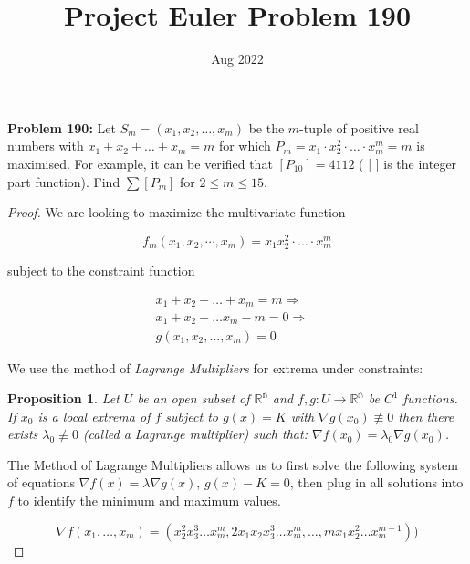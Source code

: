 \documentclass[12pt]{article}
\newtheorem{proposition}{Proposition}[section]
\begin{document}
\title{Project Euler Problem 190}
\date{Aug 2022}
\author{}
\maketitle

\textbf{Problem 190:} Let $S_m = \left(x_1, x_2,\ldots, x_m \right)$ be the $m$-tuple of positive real numbers with $x_1 + x_2 + \ldots + x_m = m$ for which $P_m = x_1 \cdot x_2^2 \cdot \ldots \cdot x_m^m = m$ is maximised. For example, it can be verified that $\left[ P_{10} \right] = 4112$ ( [ ] is the integer part function). Find $\sum \left[ P_m \right]$ for $2 \leq m \leq 15$.

\begin{proof}
We are looking to maximize the multivariate function

\begin{equation*}
f_m (x_1,x_2,\cdots,x_m) = x_1 x_2^2\cdot \ldots \cdot x_m^m
\end{equation*}

subject to the constraint function 

\begin{align*}
x_1 + x_2 + \ldots +x_m = m \Rightarrow &\\
x_1 + x_2 + \ldots x_m - m = 0 \Rightarrow &\\
g(x_1,x_2,\ldots,x_m) = 0
\end{align*}

We use the method of \textit{Lagrange Multipliers} for extrema under constraints:

\begin{proposition}
Let $U$ be an open subset of $\mathbb{R^n}$ and $f,g: U \rightarrow \mathbb{R^n}$ be $C^{1}$ functions.
If $x_0$ is a local extrema of $f$ subject to $g(x) = K$ with $\nabla g(x_0) \not\equiv 0$ then there exists $\lambda_0 \not\equiv 0$ (called a Lagrange multiplier) such that: $\nabla f(x_0) = \lambda_0 \nabla g(x_0)$.
\end{proposition}

The Method of Lagrange Multipliers allows us to first solve the following system of equations $\nabla f(x) = \lambda \nabla g(x)$, $g(x) - K = 0$, then plug in all solutions into $f$ to identify the minimum and maximum values.

\begin{equation*}
\nabla f(x_1,\ldots,x_m) = (x_2^2x_3^3 \ldots x_m^m,2x_1x_2x_3^3 \ldots x_m^m, \ldots,mx_1x_2^2 \ldots x_m^{m-1}))
\end{equation*}


\end{proof}
\end{document}
